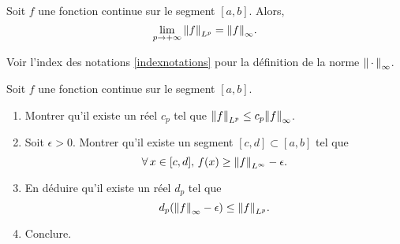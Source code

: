 \begin{theo}
Soit $f$ une fonction continue sur le segment $[a, b]$. Alors,
\[
\lim_{p\to+\infty} \norm{f}_{L^p} = \norm{f}_\infty.
\]
\end{theo}
Voir l'index des notations \ref{indexnotations} pour la définition de la norme $\norm{\,\cdot\,}_\infty$.



\begin{exercice}
Soit $f$ une fonction continue sur le segment $[a, b]$.
\begin{enumerate}
\item Montrer qu'il existe un réel $c_p$ tel que $\norm{f}_{L^p} \leq c_p \norm{f}_\infty$.

\item Soit $\epsilon > 0$. Montrer qu'il existe un segment $[c, d] \subset [a, b]$ tel que
\[
\forall\, x \in [c, d],\, f(x) \geq \norm{f}_{L^\infty} - \epsilon.
\]

\item En déduire qu'il existe un réel $d_p$ tel que
\[
d_p (\norm{f}_\infty - \epsilon) \leq \norm{f}_{L^p}.
\]

\item Conclure.
\end{enumerate}
\end{exercice}

